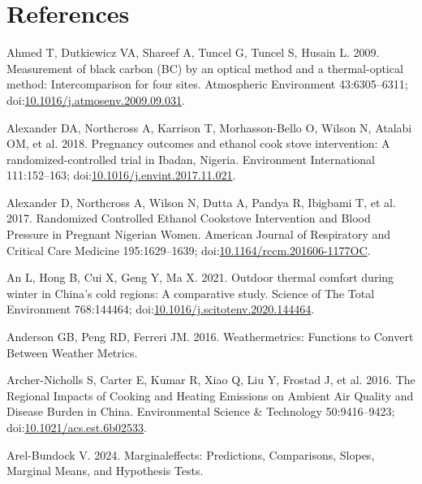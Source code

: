 \documentclass[
  letterpaper,
  DIV=11,
  numbers=noendperiod]{scrartcl}
\newlength{\cslhangindent}
\newenvironment{CSLReferences}[2] %
 {\begin{list}{}{%
  \setlength{\itemindent}{0pt}
  \setlength{\leftmargin}{0pt}
  \setlength{\parsep}{0pt}
  \ifodd #1
   \setlength{\leftmargin}{\cslhangindent}
   \setlength{\itemindent}{-1\cslhangindent}
  \fi
  \setlength{\itemsep}{#2\baselineskip}}}
 {\end{list}}
\begin{document}
\section{References}\label{references}

\label{refs}
\begin{CSLReferences}{1}{1}
Ahmed T, Dutkiewicz VA, Shareef A, Tuncel G, Tuncel S, Husain L. 2009.
Measurement of black carbon ({BC}) by an optical method and a
thermal-optical method: {Intercomparison} for four sites. Atmospheric
Environment 43:6305--6311;
doi:\href{https://doi.org/10.1016/j.atmosenv.2009.09.031}{10.1016/j.atmosenv.2009.09.031}.

Alexander DA, Northcross A, Karrison T, Morhasson-Bello O, Wilson N,
Atalabi OM, et al. 2018. Pregnancy outcomes and ethanol cook stove
intervention: {A} randomized-controlled trial in {Ibadan}, {Nigeria}.
Environment International 111:152--163;
doi:\href{https://doi.org/10.1016/j.envint.2017.11.021}{10.1016/j.envint.2017.11.021}.

Alexander D, Northcross A, Wilson N, Dutta A, Pandya R, Ibigbami T, et
al. 2017. Randomized {Controlled Ethanol Cookstove Intervention} and
{Blood Pressure} in {Pregnant Nigerian Women}. American Journal of
Respiratory and Critical Care Medicine 195:1629--1639;
doi:\href{https://doi.org/10.1164/rccm.201606-1177OC}{10.1164/rccm.201606-1177OC}.

An L, Hong B, Cui X, Geng Y, Ma X. 2021. Outdoor thermal comfort during
winter in {China}'s cold regions: {A} comparative study. Science of The
Total Environment 768:144464;
doi:\href{https://doi.org/10.1016/j.scitotenv.2020.144464}{10.1016/j.scitotenv.2020.144464}.

Anderson GB, Peng RD, Ferreri JM. 2016. Weathermetrics: {Functions} to
{Convert Between Weather Metrics}.

Archer-Nicholls S, Carter E, Kumar R, Xiao Q, Liu Y, Frostad J, et al.
2016. The {Regional Impacts} of {Cooking} and {Heating Emissions} on
{Ambient Air Quality} and {Disease Burden} in {China}. Environmental
Science \& Technology 50:9416--9423;
doi:\href{https://doi.org/10.1021/acs.est.6b02533}{10.1021/acs.est.6b02533}.

Arel-Bundock V. 2024. Marginaleffects: {Predictions}, {Comparisons},
{Slopes}, {Marginal Means}, and {Hypothesis Tests}.


\end{CSLReferences}
\end{document}
